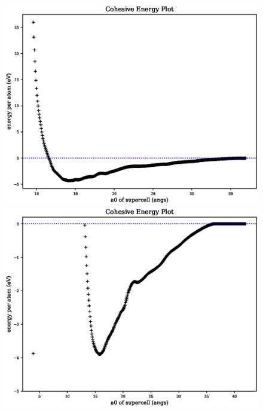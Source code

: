 \begin{figure}[ht] 
  \centering
  \begin{minipage}[b]{0.4\linewidth}
    \centering
    \includegraphics[width=.98\linewidth]{chapters/potentials_fe_pd_ru/pot_fepd_fcc_1/fe_cohesive_energy.eps} 
  \end{minipage}%
  \begin{minipage}[b]{0.4\linewidth}
    \centering
    \includegraphics[width=.98\linewidth]{chapters/potentials_fe_pd_ru/pot_fepd_fcc_1/pd_cohesive_energy_zoom.eps} 
  \end{minipage}%


\end{figure}

